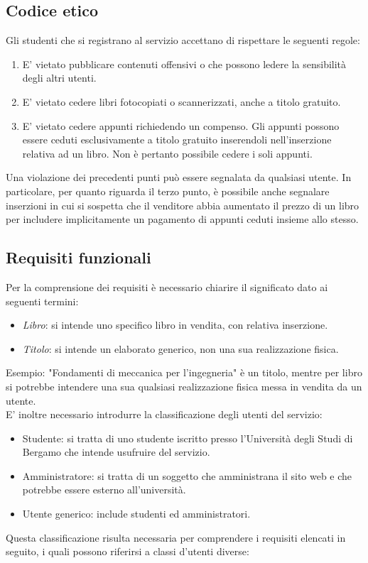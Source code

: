\documentclass[10pt,a4paper]{report}
\begin{document}
	\subsection{Codice etico}
	Gli studenti che si registrano al servizio accettano di rispettare le seguenti regole:
	\begin{enumerate}
		\item E' vietato pubblicare contenuti offensivi o che possono ledere la sensibilità degli altri utenti.
		\item E' vietato cedere libri fotocopiati o scannerizzati, anche a titolo gratuito.
		\item E' vietato cedere appunti richiedendo un compenso. Gli appunti possono essere ceduti esclusivamente a titolo gratuito inserendoli nell'inserzione relativa ad un libro. Non è pertanto possibile cedere i soli appunti. 
	\end{enumerate}
	Una violazione dei precedenti punti può essere segnalata da qualsiasi utente. In particolare, per quanto riguarda il terzo punto, è possibile anche segnalare inserzioni in cui si sospetta che il venditore abbia aumentato il prezzo di un libro per includere implicitamente un pagamento di appunti ceduti insieme allo stesso.

	\subsection{Requisiti funzionali}
	Per la comprensione dei requisiti è necessario chiarire il significato dato ai seguenti termini:
	\begin{itemize}
		\item \textit{Libro}: si intende uno specifico libro in vendita, con relativa inserzione.
		\item \textit{Titolo}: si intende un elaborato generico, non una sua realizzazione fisica.
	\end{itemize}
	Esempio: "Fondamenti di meccanica per l'ingegneria" è un titolo, mentre per libro si potrebbe intendere una sua qualsiasi realizzazione fisica messa in vendita da un utente. \\
	E' inoltre necessario introdurre la classificazione degli utenti del servizio:
	\begin{itemize}
		\item Studente: si tratta di uno studente iscritto presso l'Università degli Studi di Bergamo che intende usufruire del servizio.
		\item Amministratore: si tratta di un soggetto che amministrana il sito web e che potrebbe essere esterno all'università.
		\item Utente generico: include studenti ed amministratori.
	\end{itemize}
	Questa classificazione risulta necessaria per comprendere i requisiti elencati in seguito, i quali possono riferirsi a classi d'utenti diverse:\\
	
\end{document}
